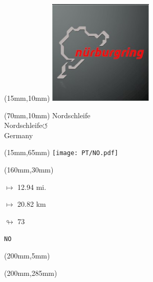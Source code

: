 \null\newpage
\begin{textblock*}{50mm}(15mm,10mm)%
\includegraphics[width=50mm]{LG/2015-05-20_00088.png}
\end{textblock*}
\begin{textblock*}{130mm}(70mm,10mm)%
{\fontsize{20}{20}\selectfont Nordschleife\\}
{\fontsize{16}{16}\selectfont Nordschleife\hfill \huge$\circlearrowleft$\\}
{\fontsize{12}{12}\selectfont Germany\\}
\end{textblock*}
\begin{textblock*}{185mm}(15mm,65mm)%
\centering
\mbox{\texttt{[image: PT/NO.pdf]}}
\end{textblock*}
\begin{textblock*}{40mm}(160mm,30mm)%
\Large
\par$\mapsto$ 12.94 mi.
\par$\mapsto$ 20.82 km
\par$\looparrowright$ 73
\par\hfill\tiny\tt NO\\
\end{textblock*}
\begin{textblock*}{20mm}(200mm,5mm)%
\fbox{\thepage}
\label{NO}
\end{textblock*}
\begin{textblock*}{20mm}(200mm,285mm)%
\fbox{\thepage}
\end{textblock*}

